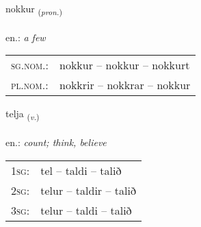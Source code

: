 \documentclass[frontgrid, backgrid]{flacards}\usepackage[]{graphicx}\usepackage[]{xcolor}
\begin{document}
\renewcommand{\flhead}{\vskip5pt \fboxsep=0pt {\small\bfseries\footnotesize Fornafn | Pronoun}}
\renewcommand{\fcfoot}{\vskip5pt \fboxsep=0pt \hspace{2pt}{\small\bfseries\footnotesize 1K}}

\renewcommand{\blhead}{\vskip5pt {\small\bfseries\footnotesize Fornafn | Pronoun }}
\renewcommand{\bcfoot}{\vskip5pt \hspace{2pt}{\small\bfseries\footnotesize 1K}}


{nokkur \small{\textsubscript{(\textit{pron.})}} \\[1ex] %
\textphonetic{[nɔhkʏr]} \\
en.: \emph{a few} \\  [2ex]
\renewcommand*{\arraystretch}{0.8}
\begin{tabular}{ll}
\textsc{sg.nom.}: & nokkur  --  nokkur -- nokkurt \\ 
\textsc{pl.nom.}: & nokkrir -- nokkrar -- nokkur
\end{tabular}
}

\renewcommand{\flhead}{\vskip5pt \fboxsep=0pt {\small\bfseries\footnotesize Sagnorð | Verb}}
\renewcommand{\fcfoot}{\vskip5pt \fboxsep=0pt \hspace{2pt}{\small\bfseries\footnotesize 1K}}

\renewcommand{\blhead}{\vskip5pt {\small\bfseries\footnotesize Sagnorð | Verb }}
\renewcommand{\bcfoot}{\vskip5pt \hspace{2pt}{\small\bfseries\footnotesize 1K}}


{telja \small{\textsubscript{(\textit{v.})}} \\[1ex] %
\textphonetic{[tʰɛlja]} \\
en.: \emph{count; think, believe} \\  [2ex]
\renewcommand*{\arraystretch}{0.8}
\begin{tabular}{p{1cm}l}
\textsc{1sg}: & tel -- taldi -- talið \\ 
\textsc{2sg}: & telur -- taldir -- talið \\ 
\textsc{3sg}: & telur -- taldi -- talið \\ 
\end{tabular}
}
\end{document}
